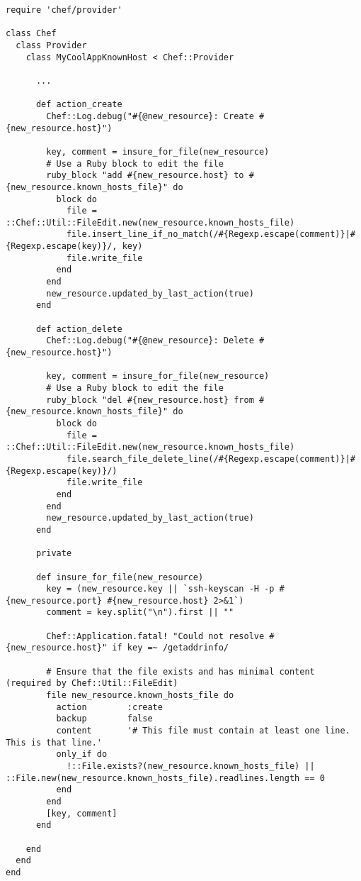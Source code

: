 \begin{lstlisting}[label=lst:cookbook-hwrp9]
require 'chef/provider'

class Chef
  class Provider
    class MyCoolAppKnownHost < Chef::Provider

      ...

      def action_create
        Chef::Log.debug("#{@new_resource}: Create #{new_resource.host}")

        key, comment = insure_for_file(new_resource)
        # Use a Ruby block to edit the file
        ruby_block "add #{new_resource.host} to #{new_resource.known_hosts_file}" do
          block do
            file = ::Chef::Util::FileEdit.new(new_resource.known_hosts_file)
            file.insert_line_if_no_match(/#{Regexp.escape(comment)}|#{Regexp.escape(key)}/, key)
            file.write_file
          end
        end
        new_resource.updated_by_last_action(true)
      end

      def action_delete
        Chef::Log.debug("#{@new_resource}: Delete #{new_resource.host}")

        key, comment = insure_for_file(new_resource)
        # Use a Ruby block to edit the file
        ruby_block "del #{new_resource.host} from #{new_resource.known_hosts_file}" do
          block do
            file = ::Chef::Util::FileEdit.new(new_resource.known_hosts_file)
            file.search_file_delete_line(/#{Regexp.escape(comment)}|#{Regexp.escape(key)}/)
            file.write_file
          end
        end
        new_resource.updated_by_last_action(true)
      end

      private

      def insure_for_file(new_resource)
        key = (new_resource.key || `ssh-keyscan -H -p #{new_resource.port} #{new_resource.host} 2>&1`)
        comment = key.split("\n").first || ""

        Chef::Application.fatal! "Could not resolve #{new_resource.host}" if key =~ /getaddrinfo/

        # Ensure that the file exists and has minimal content (required by Chef::Util::FileEdit)
        file new_resource.known_hosts_file do
          action        :create
          backup        false
          content       '# This file must contain at least one line. This is that line.'
          only_if do
            !::File.exists?(new_resource.known_hosts_file) || ::File.new(new_resource.known_hosts_file).readlines.length == 0
          end
        end
        [key, comment]
      end

    end
  end
end
\end{lstlisting}

